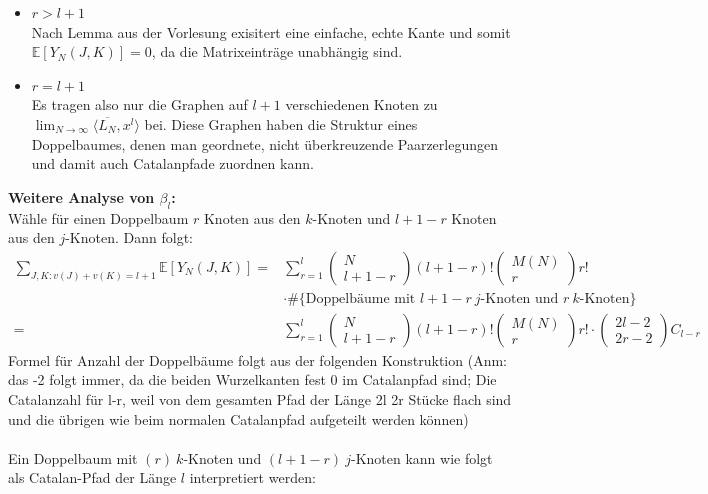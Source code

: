 \documentclass[a4paper, 11pt]{scrreprt}
\newenvironment{beweis}[1][Beweis]{\begin{trivlist}
	\item[\hskip \labelsep {\bfseries #1}]}
	{\end{trivlist}}
\newcommand{\EE}{\mathbb{E}}
\begin{document}
\begin{beweis}
\begin{itemize}
	\item \(r> l+1\) \\
		Nach Lemma aus der Vorlesung exisitert eine einfache, echte Kante und somit \(\EE[Y_N(J,K)]=0\), da die Matrixeinträge unabhängig sind.
	\item \(r=l+1\)\\
		Es tragen also nur die Graphen auf \(l+1\) verschiedenen Knoten zu \(\lim_{N\to\infty} \langle \overline{L_N}, x^l \rangle \) bei. Diese Graphen haben die Struktur eines Doppelbaumes, denen man geordnete, nicht überkreuzende Paarzerlegungen und damit auch Catalanpfade zuordnen kann.
\end{itemize}
\textbf{Weitere Analyse von \(\beta_l\):}\\
Wähle für einen Doppelbaum \(r\) Knoten aus den \(k\)-Knoten und \(l+1-r\) Knoten aus den \(j\)-Knoten. Dann folgt:
\begin{align*}
	\sum_{J,K: v(J)+v(K) = l+1} \EE[Y_N(J,K)] = &\sum_{r=1}^{l}\begin{pmatrix} N\\ l+1-r\end{pmatrix} (l+1-r)! \begin{pmatrix} M(N)\\r\end{pmatrix} r! \\
	&\cdot \#\{\text{Doppelbäume mit }l+1-r\ j\text{-Knoten und } r\ k\text{-Knoten}\} \\
	=& \sum_{r=1}^{l} \begin{pmatrix} N\\ l+1-r\end{pmatrix} (l+1-r)! \begin{pmatrix} M(N)\\r\end{pmatrix} r! \cdot \begin{pmatrix} 2l-2\\2r-2\end{pmatrix} C_{l-r}
\end{align*}
Formel für Anzahl der Doppelbäume folgt aus der folgenden Konstruktion (Anm: das -2 folgt immer, da die beiden Wurzelkanten fest 0 im Catalanpfad sind; Die Catalanzahl für l-r, weil von dem gesamten Pfad der Länge 2l 2r Stücke flach sind und die übrigen wie beim normalen Catalanpfad aufgeteilt werden können) \\ \\
Ein Doppelbaum mit \((r)\  k\)-Knoten und \((l+1-r)\ j\)-Knoten kann wie folgt als Catalan-Pfad der Länge \(l\) interpretiert werden:\\

\end{beweis}
\end{document}

